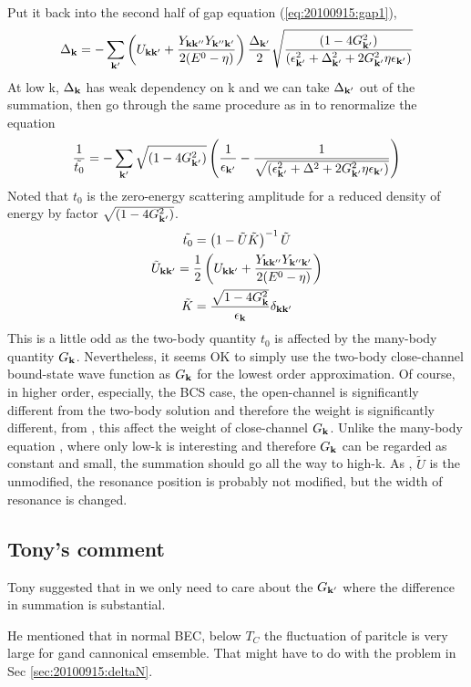 Put it back into the second half of gap equation (\ref{eq:20100915:gap1}), 
\[
\Delta_{\mathbf{k}}=-\sum_{\mathbf{k}'}\left(U_{\mathbf{k}\mathbf{k}'}+\frac{Y_{\mathbf{k}\mathbf{k}''}Y_{\mathbf{k}''\mathbf{k}'}}{2(E^{0}-\eta)}\right)\frac{\Delta_{\mathbf{k}'}}2\sqrt{\frac{(1-4G_{\mathbf{k}'}^{2})}{(\epsilon_{\mathbf{k}'}^{2}+\Delta_{\mathbf{k}'}^{2}+2G_{\mathbf{k}'}^{2}\eta\epsilon_{\mathbf{k}'})}}
\]
At low k, $\Delta_{\mathbf{k}}$ has weak dependency on k and we can take $\Delta_{\mathbf{k}'}$ out of the summation,  then go through the same procedure as in \cite{Leggett,Fetter} to renormalize the equation
\begin{equation}\label{eq:20100915:renormGap}
\frac{1}{\tilde{t_{0}}}=-\sum_{\mathbf{k}'}\sqrt{(1-4G_{\mathbf{k}'}^{2})}
\left(\frac{1}{\epsilon_{\mathbf{k}'}}-\frac{1}{\sqrt{(\epsilon_{\mathbf{k}'}^{2}+\Delta^{2}+2G_{\mathbf{k}'}^{2}\eta\epsilon_{\mathbf{k}'})}}\right)
\end{equation}
Noted that $t_{0}$ is the zero-energy scattering amplitude for a reduced density of energy by factor $\sqrt{(1-4G_{\mathbf{k}'}^{2})}$.  
\begin{gather}
\tilde{t_{0}}=\left(1-\tilde{U}\tilde{ K}\right)^{-1}\tilde{U}\label{eq:20100915:t0}\\
\tilde{U}_{\mathbf{k}\mathbf{k}'}=\frac{1}{2} \left(U_{\mathbf{k}\mathbf{k}'}+\frac{Y_{\mathbf{k}\mathbf{k}''}Y_{\mathbf{k}''\mathbf{k}'}}{2(E^{0}-\eta)}\right)\label{eq:20100915:tu}\\
\tilde{K}=\frac{\sqrt{1-4G_{\mathbf{k}}^{2}}}{\epsilon_{\mathbf{k}}}\delta_{\mathbf{k}\mathbf{k}'}
\end{gather}
This is a little odd as the two-body quantity $t_{0}$ is affected by the many-body quantity $G_{\mathbf{k}}$.  Nevertheless, it seems OK to simply use the two-body close-channel bound-state wave function as $G_{\mathbf{k}}$ for the lowest order approximation.   Of course, in higher order, especially, the BCS case, the open-channel is significantly different from the two-body solution and therefore the weight is significantly different, from , this affect the weight of close-channel $G_{\mathbf{k}}$.  Unlike the many-body equation , where only low-k is interesting and therefore $G_{\mathbf{k}}$ can be regarded as constant and small, the summation should go all the way to high-k.  As , $\tilde{U}$ is the unmodified, the resonance position is probably not modified, but the width of resonance is changed.  



\subsection{Tony's comment}
Tony suggested that in  we only need to care about the $G_{\mathbf{k}'}$ where the difference in summation is substantial.  

He mentioned that in normal BEC, below $T_{C}$ the fluctuation of paritcle is very large for gand cannonical emsemble.  That might have to do with the problem in Sec \ref{sec:20100915:deltaN}.
